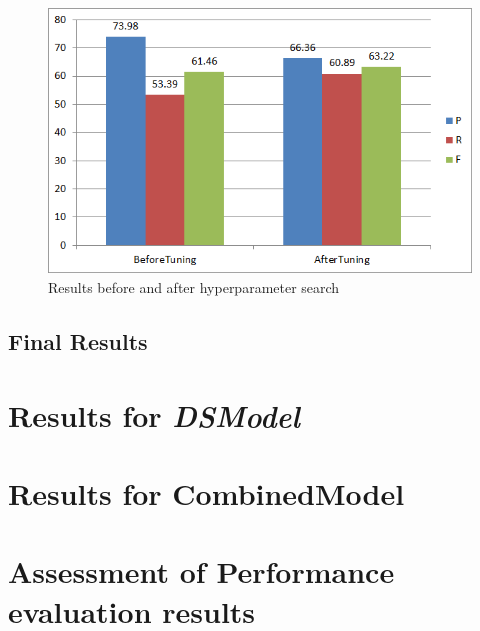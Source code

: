 \begin{figure}
\centering
\includegraphics[scale=0.6]{figures/SSModelRegPar.png}
\caption{Results before and after hyperparameter search}\label{fig:SSModelRegPar}
\end{figure}

\subsection{Final Results}\label{subsec:SSFinalRes}

\section{Results for \textit{DSModel}}

\section{Results for CombinedModel}

\section{Assessment of Performance evaluation results}

